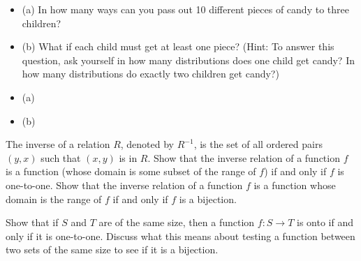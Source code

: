 \documentclass[12pt,letterpaper,boxed]{amspset}
\begin{document}
\begin{solution}

\end{solution}



\begin{problem}[1.2.14]
\begin{itemize}
  \item{(a)}      In how many ways can you pass out 10 different pieces of
candy to three children?
  \item{(b)}      What if each child must get at least one piece? (Hint: To
answer this question, ask yourself in how many distributions does one
child get candy? In how many distributions do exactly two children get
candy?)
\end{itemize}
\end{problem}
\begin{itemize}
  \item{(a)}      
  \item{(b)}      
\end{itemize}

\begin{solution}

\end{solution}



\begin{problem}[1.2.15 (optional)]
The inverse of a relation $R$, denoted by $R^{-1}$, is the set of all
ordered pairs $(y,x)$ such that $(x,y)$ is in $R$. Show that the
inverse relation of a function $f$ is a function (whose domain is some
subset of the range of $f$) if and only if $f$ is one-to-one. Show
that the inverse relation of a function $f$ is a function whose domain
is the range of $f$ if and only if $f$ is a bijection.
\end{problem}

\begin{solution}

\end{solution}



\begin{problem}[1.2.20 (optional)]
Show that if $S$ and $T$ are of the same size, then a function $f: S
\rightarrow T$ is onto if and only if it is one-to-one. Discuss what
this means about testing a function between two sets of the same size
to see if it is a bijection.
\end{problem}

\begin{solution}

\end{solution}
\end{document}
